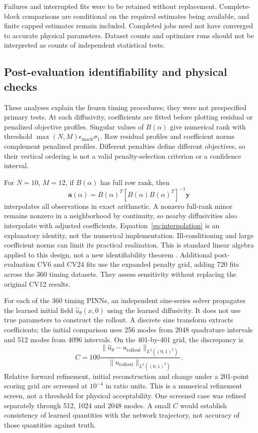 \documentclass[11pt,a4paper]{article}
\begin{document}
Failures and interrupted fits were to be retained without replacement. Complete-block comparisons are conditional on the required estimates being available, and finite capped estimates remain included. Completed jobs need not have converged to accurate physical parameters. Dataset counts and optimizer runs should not be interpreted as counts of independent statistical tests.

\subsection{Post-evaluation identifiability and physical checks}
These analyses explain the frozen timing procedures; they were not prespecified primary tests. At each diffusivity, coefficients are fitted before plotting residual or penalized objective profiles. Singular values of $B(\alpha)$ give numerical rank with threshold $\max(N,M)\epsilon_{\mathrm{mach}}\sigma_1$. Raw residual profiles and coefficient norms complement penalized profiles. Different penalties define different objectives, so their vertical ordering is not a valid penalty-selection criterion or a confidence interval.

For $N=10$, $M=12$, if $B(\alpha)$ has full row rank, then
\begin{equation}
 \boldsymbol a(\alpha)=B(\alpha)^T[B(\alpha)B(\alpha)^T]^{-1}\boldsymbol y
\label{eq:interpolation}
\end{equation}
interpolates all observations in exact arithmetic. A nonzero full-rank minor remains nonzero in a neighborhood by continuity, so nearby diffusivities also interpolate with adjusted coefficients. Equation~\eqref{eq:interpolation} is an explanatory identity, not the numerical implementation. Ill-conditioning and large coefficient norms can limit its practical realization. This is standard linear algebra applied to this design, not a new identifiability theorem \citep{ref011}. Additional post-evaluation CV6 and CV24 fits use the expanded penalty grid, adding 720 fits across the 360 timing datasets. They assess sensitivity without replacing the original CV12 results.

For each of the 360 timing PINNs, an independent sine-series solver propagates the learned initial field $\widehat u_\theta(x,0)$ using the learned diffusivity. It does not use true parameters to construct the rollout. A discrete sine transform extracts coefficients; the initial comparison uses 256 modes from 2048 quadrature intervals and 512 modes from 4096 intervals. On the 401-by-401 grid, the discrepancy is
\begin{equation}
 C=100\frac{\|\widehat u_\theta-u_{\mathrm{rollout}}\|_{L^2((0,1)^2)}}{\|u_{\mathrm{rollout}}\|_{L^2((0,1)^2)}}.
\end{equation}
Relative forward refinement, initial reconstruction and change under a 201-point scoring grid are screened at $10^{-4}$ in ratio units. This is a numerical refinement screen, not a threshold for physical acceptability. One screened case was refined separately through 512, 1024 and 2048 modes. A small $C$ would establish consistency of learned quantities with the network trajectory, not accuracy of those quantities against truth.
\end{document}
